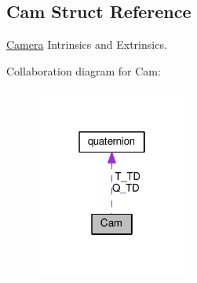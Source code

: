 \hypertarget{structCam}{}\subsection{Cam Struct Reference}
\label{structCam}


\hyperlink{classCamera}{Camera} Intrinsics and Extrinsics.  




Collaboration diagram for Cam\+:\nopagebreak
\begin{figure}[H]
\begin{center}
\leavevmode
\includegraphics[width=142pt]{structCam__coll__graph}
\end{center}
\end{figure}
